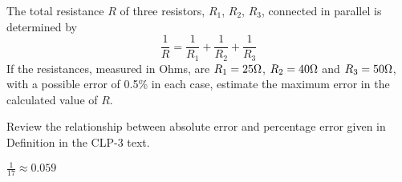 \begin{question}
The total resistance $R$ of three resistors, $R_1$, $R_2$, $R_3$, connected
in parallel is determined by
\begin{equation*}
\frac{1}{R}=\frac{1}{R_1}+\frac{1}{R_2}+\frac{1}{R_3}
\end{equation*}
If the resistances, measured in Ohms, are $R_1=25\Omega$, $R_2=40\Omega$ and
$R_3=50\Omega$, with a possible error of 0.5\% in each case, estimate the
maximum error in the calculated value of $R$.
\end{question}

\begin{hint}
Review the relationship between absolute error and percentage error
given in Definition  in the CLP-3 text.
\end{hint}

\begin{answer}
$\frac{1}{17}\approx 0.059$

\end{answer}


